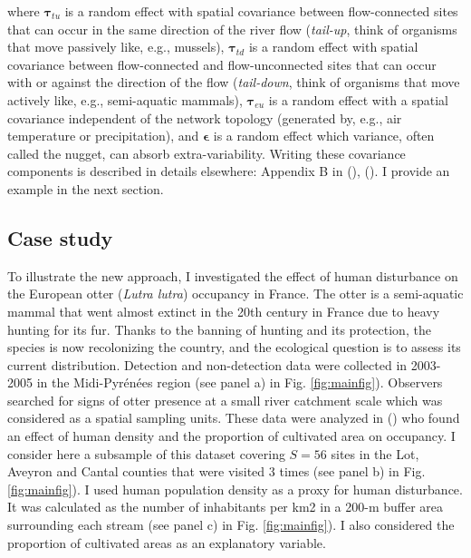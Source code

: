 \documentclass[
  11pt,
  a4paper,
]{article}
\begin{document}
where \(\boldsymbol{\tau}_{tu}\) is a random effect with spatial covariance between flow-connected sites that can occur in the same direction of the river flow (\emph{tail-up}, think of organisms that move passively like, e.g., mussels), \(\boldsymbol{\tau}_{td}\) is a random effect with spatial covariance between flow-connected and flow-unconnected sites that can occur with or against the direction of the flow (\emph{tail-down}, think of organisms that move actively like, e.g., semi-aquatic mammals), \(\boldsymbol{\tau}_{eu}\) is a random effect with a spatial covariance independent of the network topology (generated by, e.g., air temperature or precipitation), and \(\boldsymbol{\epsilon}\) is a random effect which variance, often called the nugget, can absorb extra-variability. Writing these covariance components is described in details elsewhere: Appendix B in (), (). I provide an example in the next section.

\subsection{Case study}\label{case-study}

To illustrate the new approach, I investigated the effect of human disturbance on the European otter (\emph{Lutra lutra}) occupancy in France. The otter is a semi-aquatic mammal that went almost extinct in the 20th century in France due to heavy hunting for its fur. Thanks to the banning of hunting and its protection, the species is now recolonizing the country, and the ecological question is to assess its current distribution. Detection and non-detection data were collected in 2003-2005 in the Midi-Pyrénées region (see panel a) in Fig. \ref{fig:mainfig}). Observers searched for signs of otter presence at a small river catchment scale which was considered as a spatial sampling units. These data were analyzed in () who found an effect of human density and the proportion of cultivated area on occupancy. I consider here a subsample of this dataset covering \(S = 56\) sites in the Lot, Aveyron and Cantal counties that were visited 3 times (see panel b) in Fig. \ref{fig:mainfig}). I used human population density as a proxy for human disturbance. It was calculated as the number of inhabitants per km2 in a 200-m buffer area surrounding each stream (see panel c) in Fig. \ref{fig:mainfig}). I also considered the proportion of cultivated areas as an explanatory variable.
\end{document}
